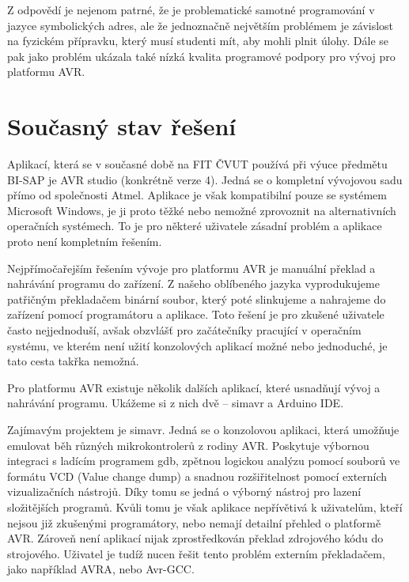 Z odpovědí je nejenom patrné, že je problematické samotné programování v jazyce symbolických adres, ale že jednoznačně největším problémem je závislost na fyzickém přípravku, který musí studenti mít, aby mohli plnit úlohy. Dále se pak jako problém ukázala také nízká kvalita programové podpory pro vývoj pro platformu AVR.

\section{Současný stav řešení}

Aplikací, která se v současné době na FIT ČVUT používá při výuce předmětu BI-SAP je AVR studio (konkrétně verze 4)\cite{sap-avr-studio}. Jedná se o kompletní vývojovou sadu přímo od společnosti Atmel\footnotemark. Aplikace je však kompatibilní pouze se systémem Microsoft Windows\cite{avr-studio-requirements}, je ji proto těžké nebo nemožné zprovoznit na alternativních operačních systémech. To je pro některé uživatele zásadní problém a aplikace proto není kompletním řešením.


Nejpřímočařejším řešením vývoje pro platformu AVR je manuální překlad a nahrávání programu do zařízení. Z našeho oblíbeného jazyka vyprodukujeme patřičným překladačem binární soubor, který poté slinkujeme a nahrajeme do zařízení pomocí programátoru a aplikace. Toto řešení je pro zkušené uživatele často nejjednoduší, avšak obzvlášť pro začátečníky pracující v operačním systému, ve kterém není užití konzolových aplikací možné nebo jednoduché, je tato cesta takřka nemožná.

Pro platformu AVR existuje několik dalších aplikací, které usnadňují vývoj a nahrávání programu. Ukážeme si z nich dvě -- simavr\cite{github-simavr} a Arduino IDE\cite{arduino-ide}.


Zajímavým projektem je simavr\cite{github-simavr}. Jedná se o konzolovou aplikaci, která umožňuje emulovat běh různých mikrokontrolerů z rodiny AVR. Poskytuje výbornou integraci s ladícím programem gdb, zpětnou logickou analýzu pomocí souborů ve formátu VCD (Value change dump) a snadnou rozšiřitelnost pomocí externích vizualizačních nástrojů. Díky tomu se jedná o výborný nástroj pro lazení složitějších programů. Kvůli tomu je však aplikace nepřívětivá k uživatelům, kteří nejsou již zkušenými programátory, nebo nemají detailní přehled o platformě AVR. Zároveň není aplikací nijak zprostředkován překlad zdrojového kódu do strojového. Uživatel je tudíž nucen řešit tento problém externím překladačem, jako například AVRA\cite{avra}, nebo Avr-GCC\cite{avr-gcc}.

